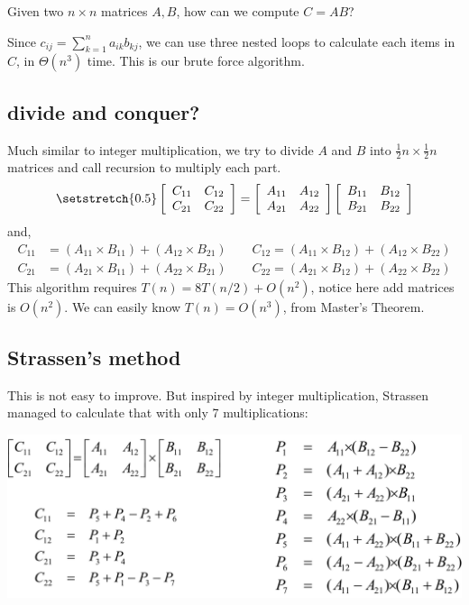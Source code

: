 \begin{spacing}{1.3}
    Given two $n\times n$ matrices $A, B$, how can we compute 
    $C=AB$?
    
    Since $c_{ij}=\sum_{k=1}^{n}a_{ik}b_{kj}$, 
    we can use three nested loops to calculate each items in $C$,
    in $\Theta(n^3)$ time. This is our brute force algorithm.

    \subsection{divide and conquer?}

    Much similar to integer multiplication, we try to divide 
    $A$ and $B$ into $\frac{1}{2}n\times \frac{1}{2}n$ matrices 
    and call recursion to multiply each part.
    \begin{align*}
        \setstretch{0.5}
        \left[ \begin{array}{cc}
            C_{11} & C_{12} \\
            C_{21} & C_{22}
        \end{array} \right]
        =
        \left[ \begin{array}{cc}
            A_{11} & A_{12} \\
            A_{21} & A_{22}
        \end{array} \right]
        \left[ \begin{array}{cc}
            B_{11} & B_{12} \\
            B_{21} & B_{22}
        \end{array} \right]
    \end{align*}
    and,
    \begin{align*}
        C_{11} &= (A_{11}\times B_{11}) + (A_{12}\times B_{21}) \qquad 
        C_{12} = (A_{11}\times B_{12}) + (A_{12}\times B_{22}) \\
        C_{21} &= (A_{21}\times B_{11}) + (A_{22}\times B_{21}) \qquad 
        C_{22} = (A_{21}\times B_{12}) + (A_{22}\times B_{22}) 
    \end{align*}
    This algorithm requires $T(n)=8T(n/2)+O(n^2)$, notice 
    here add matrices is $O(n^2)$. We can easily know 
    $T(n)=O(n^3)$, from Master's Theorem.

    \subsection{Strassen's method}

    This is not easy to improve. But inspired by integer multiplication,
    Strassen managed to calculate that with only 7 multiplications:
    \begin{center}
        \includegraphics[scale=0.19]{images/02-matrix-mult.jpg}
    \end{center}
    

\end{spacing}
